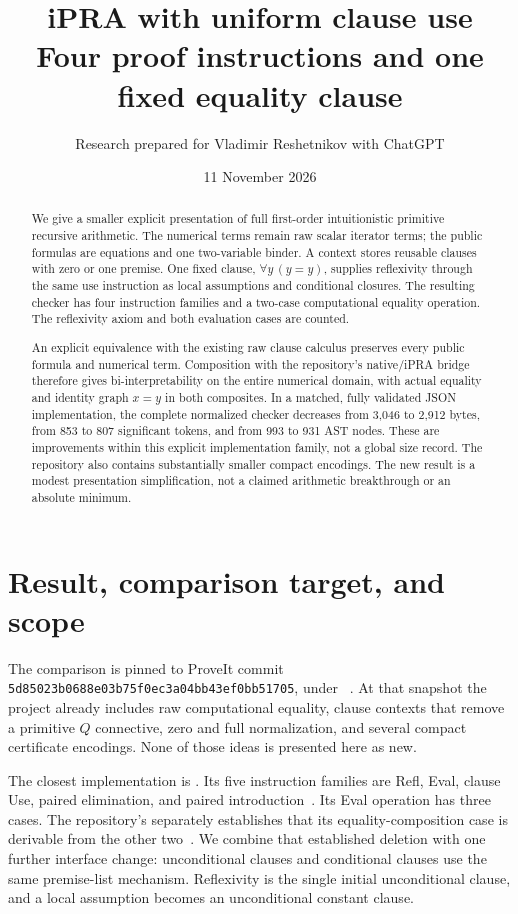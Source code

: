 \documentclass[11pt,letterpaper]{article}
\title{\textbf{iPRA with uniform clause use}\\[4pt]\large Four proof instructions and one fixed equality clause}
\author{Research prepared for Vladimir Reshetnikov with ChatGPT}
\date{11 November 2026}
\theoremstyle{definition}\newtheorem{definition}[theorem]{Definition}
\begin{document}
\maketitle
\begin{abstract}
We give a smaller explicit presentation of full first-order intuitionistic
primitive recursive arithmetic. The numerical terms remain raw scalar
iterator terms; the public formulas are equations and one two-variable
binder. A context stores reusable clauses with zero or one premise. One
fixed clause, $\forall y\,(y=y)$, supplies reflexivity through the same use
instruction as local assumptions and conditional closures. The resulting
checker has four instruction families and a two-case computational equality
operation. The reflexivity axiom and both evaluation cases are counted.

An explicit equivalence with the existing raw clause calculus preserves
every public formula and numerical term. Composition with the repository's
native/iPRA bridge therefore gives bi-interpretability on the entire
numerical domain, with actual equality and identity graph $x=y$ in both
composites. In a matched, fully validated JSON implementation, the complete
normalized checker decreases from 3,046 to 2,912 bytes, from 853 to 807
significant tokens, and from 993 to 931 AST nodes. These are improvements
within this explicit implementation family, not a global size record. The
repository also contains substantially smaller compact encodings. The new
result is a modest presentation simplification, not a claimed arithmetic
breakthrough or an absolute minimum.
\end{abstract}

\section{Result, comparison target, and scope}

The comparison is pinned to ProveIt commit
\texttt{5d85023b0688e03b75f0ec3a04bb43ef0bb51705}, under
~\cite{overview}.
At that snapshot the project already includes raw computational equality,
clause contexts that remove a primitive $Q$ connective, zero and full
normalization, and several compact certificate encodings. None of those
ideas is presented here as new.

The closest implementation is
. Its five instruction
families are Refl, Eval, clause Use, paired elimination, and paired
introduction~\cite{raw}. Its Eval operation has three cases. The repository's
 separately establishes that its equality-composition
case is derivable from the other two~\cite{eval}. We combine that established
deletion with one further interface change: unconditional clauses and
conditional clauses use the same premise-list mechanism. Reflexivity is the
single initial unconditional clause, and a local assumption becomes an
unconditional constant clause.
\end{document}
